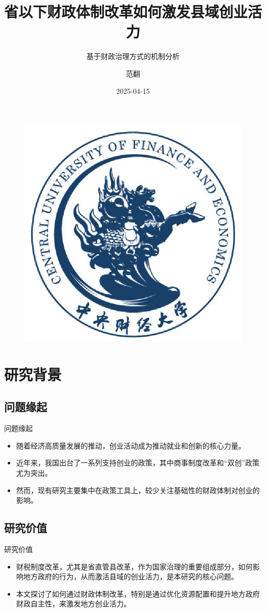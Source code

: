 \documentclass{beamer}
\title{省以下财政体制改革如何激发县域创业活力}
\subtitle{基于财政治理方式的机制分析}
\author{范翻}
\institute{中国财政发展协同创新中心}
\date{2025-04-15}
\newcommand{\tightlist}{%
  \setlength{\itemsep}{0pt}\setlength{\parskip}{0pt}}
\begin{document}
\kaishu  %
\begin{frame}
  \titlepage
  \begin{figure}[htpb]
    \centering
    \includegraphics[width=0.2\linewidth]{pic/cufe_logo_blue.eps}
  \end{figure}
\end{frame}



\section{研究背景}\label{ux7814ux7a76ux80ccux666f}

\subsection{问题缘起}\label{ux95eeux9898ux7f18ux8d77}

\begin{frame}{问题缘起}
\begin{itemize}
\tightlist
\item
  随着经济高质量发展的推动，创业活动成为推动就业和创新的核心力量。
\item
  近年来，我国出台了一系列支持创业的政策，其中商事制度改革和``双创''政策尤为突出。
\item
  然而，现有研究主要集中在政策工具上，较少关注基础性的财政体制对创业的影响。
\end{itemize}
\end{frame}

\subsection{研究价值}\label{ux7814ux7a76ux4ef7ux503c}

\begin{frame}{研究价值}
\begin{itemize}
\tightlist
\item
  财税制度改革，尤其是省直管县改革，作为国家治理的重要组成部分，如何影响地方政府的行为，从而激活县域的创业活力，是本研究的核心问题。
\item
  本文探讨了如何通过财政体制改革，特别是通过优化资源配置和提升地方政府财政自主性，来激发地方创业活力。
\end{itemize}
\end{frame}
\end{document}
